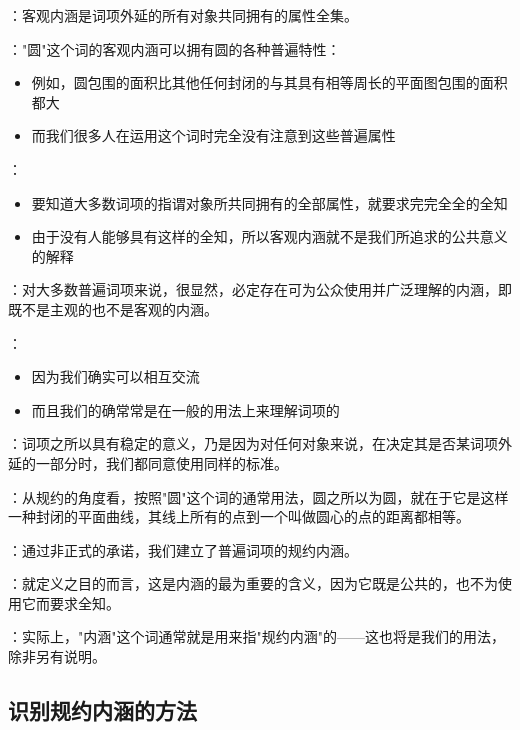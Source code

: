 \begin{theorembox}[title=客观内涵]
：客观内涵是词项外延的所有对象共同拥有的属性全集。

："圆"这个词的客观内涵可以拥有圆的各种普遍特性：
\begin{itemize}
  \item 例如，圆包围的面积比其他任何封闭的与其具有相等周长的平面图包围的面积都大
  \item 而我们很多人在运用这个词时完全没有注意到这些普遍属性
\end{itemize}

：
\begin{itemize}
  \item 要知道大多数词项的指谓对象所共同拥有的全部属性，就要求完完全全的全知
  \item 由于没有人能够具有这样的全知，所以客观内涵就不是我们所追求的公共意义的解释
\end{itemize}
\end{theorembox}

\begin{theorembox}[title=规约内涵]
：对大多数普遍词项来说，很显然，必定存在可为公众使用并广泛理解的内涵，即既不是主观的也不是客观的内涵。

：
\begin{itemize}
  \item 因为我们确实可以相互交流
  \item 而且我们的确常常是在一般的用法上来理解词项的
\end{itemize}

：词项之所以具有稳定的意义，乃是因为对任何对象来说，在决定其是否某词项外延的一部分时，我们都同意使用同样的标准。

：从规约的角度看，按照"圆"这个词的通常用法，圆之所以为圆，就在于它是这样一种封闭的平面曲线，其线上所有的点到一个叫做圆心的点的距离都相等。

：通过非正式的承诺，我们建立了普遍词项的规约内涵。

：就定义之目的而言，这是内涵的最为重要的含义，因为它既是公共的，也不为使用它而要求全知。

：实际上，"内涵"这个词通常就是用来指"规约内涵"的——这也将是我们的用法，除非另有说明。
\end{theorembox}

\subsection{识别规约内涵的方法}

